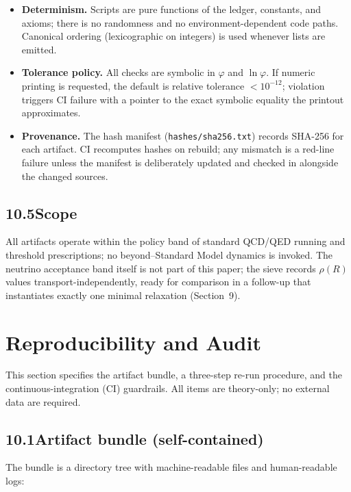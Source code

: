 \documentclass[11pt]{article}
\begin{document}
\begin{itemize}
  \item \textbf{Determinism.} Scripts are pure functions of the ledger, constants, and axioms; there is no randomness and no environment-dependent code paths. Canonical ordering (lexicographic on integers) is used whenever lists are emitted.
  \item \textbf{Tolerance policy.} All checks are symbolic in $\varphi$ and $\ln\varphi$. If numeric printing is requested, the default is relative tolerance $<10^{-12}$; violation triggers CI failure with a pointer to the exact symbolic equality the printout approximates.
  \item \textbf{Provenance.} The hash manifest (\texttt{hashes/sha256.txt}) records SHA-256 for each artifact. CI recomputes hashes on rebuild; any mismatch is a red-line failure unless the manifest is deliberately updated and checked in alongside the changed sources.
\end{itemize}

\subsection*{10.5\quad Scope}

All artifacts operate within the policy band of standard QCD/QED running and threshold prescriptions; no beyond–Standard Model dynamics is invoked. The neutrino acceptance band itself is not part of this paper; the sieve records $\rho(R)$ values transport-independently, ready for comparison in a follow-up that instantiates exactly one minimal relaxation (Section~9).

\setcounter{section}{9}

\section{Reproducibility and Audit}

This section specifies the artifact bundle, a three-step re-run procedure, and the continuous-integration (CI) guardrails. All items are theory-only; no external data are required.

\subsection*{10.1\quad Artifact bundle (self-contained)}

The bundle is a directory tree with machine-readable files and human-readable logs:
\end{document}
